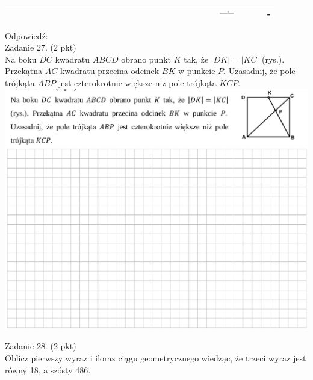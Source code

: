 \documentclass[10pt]{article}
\begin{document}
\begin{center}
\begin{tabular}{|c|c|c|c|c|c|c|c|c|c|c|c|c|c|c|c|c|c|c|c|c|c|c|c|c|c|c|c|c|c|}
\hline
 &  &  &  &  &  &  &  &  &  &  &  &  &  &  &  &  &  &  &  &  &  &  &  &  & \includegraphics[max width=\textwidth]{2024_11_21_9a9f600c3b3af5013d80g-10}
 &  &  &  & - \\
\hline
\end{tabular}
\end{center}

Odpowiedź:\\
Zadanie 27. (2 pkt)\\
Na boku \(D C\) kwadratu \(A B C D\) obrano punkt \(K\) tak, że \(|D K|=|K C|\) (rys.). Przekątna \(A C\) kwadratu przecina odcinek \(B K\) w punkcie \(P\). Uzasadnij, że pole trójkąta \(A B P\) jest czterokrotnie większe niż pole trójkąta \(K C P\).\\
\includegraphics[max width=\textwidth, center]{2024_11_21_9a9f600c3b3af5013d80g-10(1)}

Zadanie 28. (2 pkt)\\
Oblicz pierwszy wyraz i iloraz ciągu geometrycznego wiedząc, że trzeci wyraz jest równy 18, a szósty 486.
\end{document}
